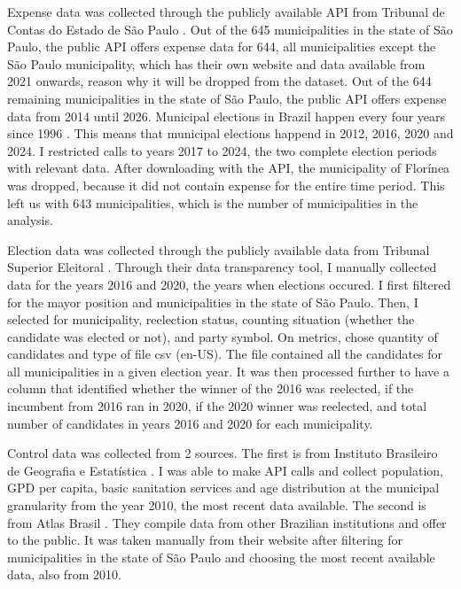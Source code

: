 \documentclass[12pt, a4paper]{article}
\begin{document}
Expense data was collected through the publicly available API from Tribunal de Contas do Estado de São Paulo \cite{TCESP:expenses}. Out of the 645 municipalities in the state of São Paulo, the public API offers expense data for 644, all municipalities except the São Paulo municipality, which has their own website and data available from 2021 onwards, reason why it will be dropped from the dataset. Out of the 644 remaining municipalities in the state of São Paulo, the public API offers expense data from 2014 until 2026. Municipal elections in Brazil happen every four years since 1996 \cite{TSE:eleicao}. This means that municipal elections happend in 2012, 2016, 2020 and 2024. I restricted calls to years 2017 to 2024, the two complete election periods with relevant data. After downloading with the API, the municipality of Florínea was dropped, because it did not contain expense for the entire time period. This left us with 643 municipalities, which is the number of municipalities in the analysis.

Election data was collected through the publicly available data from Tribunal Superior Eleitoral \cite{TSE:data}. Through their data transparency tool, I manually collected data for the years 2016 and 2020, the years when elections occured. I first filtered for the mayor position and municipalities in the state of São Paulo. Then, I selected for municipality, reelection status, counting situation (whether the candidate was elected or not), and party symbol. On metrics, chose quantity of candidates and type of file csv (en-US). The file contained all the candidates for all municipalities in a given election year. It was then processed further to have a column that identified whether the winner of the 2016 was reelected, if the incumbent from 2016 ran in 2020, if the 2020 winner was reelected, and total number of candidates in years 2016 and 2020 for each municipality.

Control data was collected from 2 sources. The first is from Instituto Brasileiro de Geografia e Estatística \cite{IBGE:sidra}. I was able to make API calls and collect population, GPD per capita, basic sanitation services and age distribution at the municipal granularity from the year 2010, the most recent data available. The second is from Atlas Brasil \cite{atlas:idh}. They compile data from other Brazilian institutions and offer to the public. It was taken manually from their website after filtering for municipalities in the state of São Paulo and choosing the most recent available data, also from 2010.
\end{document}
